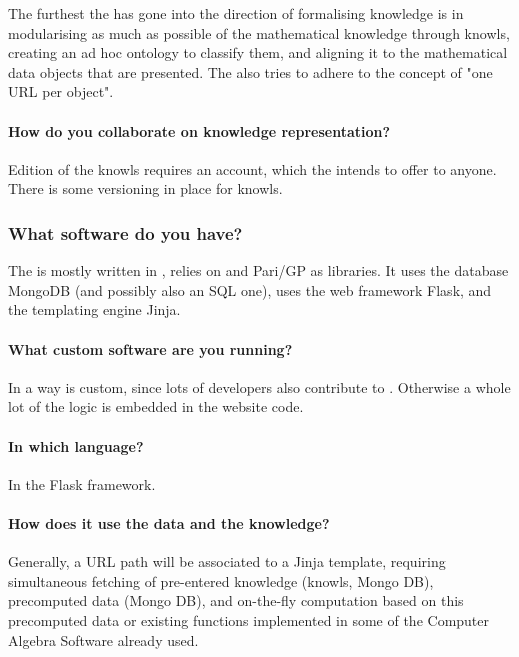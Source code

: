    The furthest the \LMFDB has gone into the direction of formalising knowledge is in modularising as much as possible of the mathematical knowledge through knowls, creating an ad hoc ontology to classify them, and aligning it to the mathematical data objects that are presented. The \LMFDB also tries to adhere to the concept of "one URL per object".

 \paragraph{How do you collaborate on knowledge representation?}

   Edition of the knowls requires an account, which the \LMFDB intends to offer to anyone. There is some versioning in place for knowls.

\subsubsection{What software do you have?}

 The \LMFDB is mostly written in \python, relies on \SageMath and Pari/GP as libraries. It uses the database MongoDB (and possibly also an SQL one), uses the web framework Flask, and the templating engine Jinja.

 \paragraph{What custom software are you running?}

   In a way \SageMath is custom, since lots of \LMFDB developers also contribute to \SageMath. Otherwise a whole lot of the logic is embedded in the website code.

\paragraph{In which language?}

   In the Flask framework.

 \paragraph{How does it use the data and the knowledge?}

   Generally, a URL path will be associated to a Jinja template, requiring simultaneous fetching of pre-entered knowledge (knowls, Mongo DB), precomputed data (Mongo DB), and on-the-fly computation based on this precomputed data or existing functions implemented in some of the Computer Algebra Software already used.

